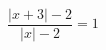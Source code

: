 \begin{ex}[type=equation]
	\begin{condition}
		$\dfrac{\big|x + 3\big| - 2}{\big|x\big| - 2} = 1$
	\end{condition}
\end{ex}